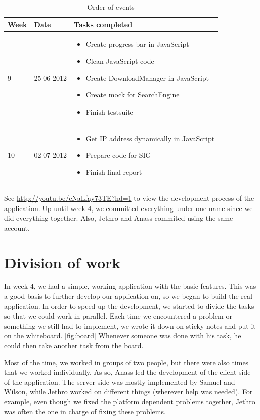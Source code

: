\begin{table}
\centering
	\begin{tabular}{| l | l | p{8 cm} |}
		\hline
		Week & Date & Tasks completed \\
		\hline
		\hline
		9 & 25-06-2012 &		\begin{itemize}
								\item Create progress bar in JavaScript
								\item Clean JavaScript code
								\item Create DownloadManager in JavaScript
								\item Create mock for SearchEngine
								\item Finish testsuite
							\end{itemize} \\
		\hline
		10 & 02-07-2012 &	\begin{itemize}
								\item Get IP address dynamically in JavaScript
								\item Prepare code for SIG
								\item Finish final report
							\end{itemize} \\
		\hline
\end{tabular}
\caption{Order of events}
\label{tab:planning3}
\end{table}

See \url{http://youtu.be/cNaLfay73TE?hd=1} to view the development process of the application.
Up until week 4, we committed everything under one name since we did everything together.
Also, Jethro and Anass commited using the same account.

\section{Division of work}
In week 4, we had a simple, working application with the basic features. This was a good basis to further develop our application on,
so we began to build the real application. In order to speed up the development, we started to divide the tasks so that we could work in parallel.
Each time we encountered a problem or something we still had to implement,
 we wrote it down on sticky notes and put it on the whiteboard. \ref{fig:board} Whenever someone was done with his task, he could then take another task from the board.

Most of the time, we worked in groups of two people, but there were also times that we worked individually.
As so, Anass led the development of the client side of the application. The server side was mostly implemented by Samuel and Wilson, while Jethro
 worked on different things (wherever help was needed). For example, even though we fixed the platform dependent problems together,
 Jethro was often the one in charge of fixing these problems.

